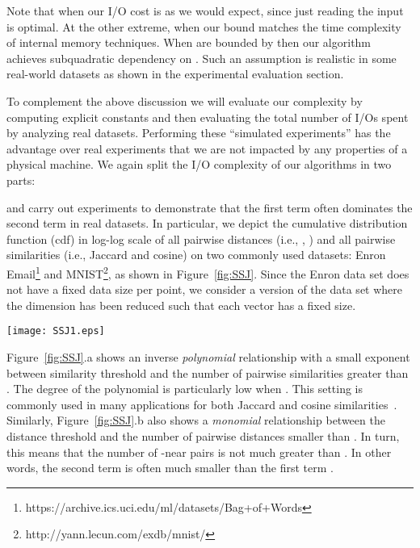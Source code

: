 \documentclass{llncs}
\newcommand{\ms}[1]{{#1}}
\begin{document}
Note that when  our I/O cost is  as we would expect, since just reading the input is optimal. 
At the other extreme, when  our bound matches the time complexity of internal memory techniques. 
When  are bounded by  then our algorithm achieves subquadratic dependency on . 
Such an assumption is realistic in some real-world datasets as shown in the experimental evaluation section.



\smallskip

\ms{To complement the above discussion we will evaluate our complexity by computing explicit constants and then evaluating the total number of I/Os spent by analyzing real datasets. Performing these ``simulated experiments'' has the advantage over real experiments that we are not impacted by any properties of a physical machine.}
We again split the I/O complexity of our algorithms in two parts:

and carry out experiments to demonstrate that the first term  often dominates the second term  in real datasets. 
In particular, we depict the cumulative distribution function (cdf) in log-log scale of all pairwise distances (i.e., , ) and all pairwise similarities (i.e., Jaccard and cosine) on two commonly used datasets: Enron Email\footnote{https://archive.ics.uci.edu/ml/datasets/Bag+of+Words} and MNIST\footnote{http://yann.lecun.com/exdb/mnist/}, as shown in Figure~\ref{fig:SSJ}.
Since the Enron data set does not have a fixed data size per point, we consider a version of the data set where the dimension has been reduced such that each vector has a fixed size.


\begin{figure*}[t]
\centering
\texttt{[image: SSJ1.eps]}
\caption{The cumulative distributions of pairwise similarities and pairwise distances on samples of 10,000 points from Enron Email and MNIST datasets. We note that values decrease on the x-axis of Figure 1.a, while they increase in Figure 1.b.}
\label{fig:SSJ}
\end{figure*}

Figure~\ref{fig:SSJ}.a shows an inverse \textit{polynomial} relationship with a small exponent  between similarity threshold  and the number of pairwise similarities greater than .  
The degree of the polynomial is particularly low when . 
This setting  is commonly used in many applications for both Jaccard and cosine similarities~\cite{Arasu_VLDB06,Bayardo_WWW07,Xiao_WWW08}. Similarly, Figure~\ref{fig:SSJ}.b also shows a \textit{monomial} relationship between the distance threshold  and the number of pairwise distances smaller than . 
In turn, this means that the number of -near pairs  is not much greater than . 
In other words, the second term  is often much smaller than the first term .
\end{document}
